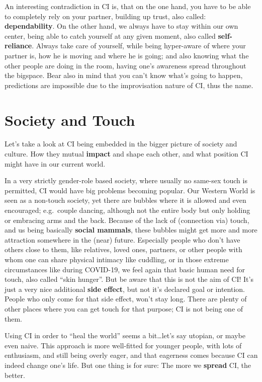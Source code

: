 An interesting contradiction in CI is, that on the one hand, you have to be able to completely rely on your partner, building up trust, also called: \textbf{dependability}.
On the other hand, we always have to stay within our own center, being able to catch yourself at any given moment, also called \textbf{self-reliance}.
Always take care of yourself, while being hyper-aware of where your partner is, how he is moving and where he is going;
and also knowing what the other people are doing in the room, having one's awareness spread throughout the \gls{bigspace}.
Bear also in mind that you can't know what's going to happen, predictions are impossible due to the improvisation nature of CI, thus the name.


\section{Society and Touch}\label{sec:society-and-touch}

Let's take a look at CI being embedded in the bigger picture of society and culture.
How they mutual \textbf{impact} and shape each other, and what position CI might have in our current world.

In a very strictly gender-role based society, where usually no same-sex touch is permitted, CI would have big problems becoming popular.
Our Western World is seen as a non-touch society, yet there are bubbles where it is allowed and even encouraged; e.g.\ couple dancing, although not the entire body but only holding or embracing arms and the back.
Because of the lack of (connection via) touch, and us being basically \textbf{social mammals}, these bubbles might get more and more attraction somewhere in the (near) future.
Especially people who don't have others close to them, like relatives, loved ones, partners, or other people with whom one can share physical intimacy like cuddling, or in those extreme circumstances like during COVID-19, we feel again that basic human need for touch, also called ``skin hunger''.
But be aware that this is not the aim of CI!
It's just a very nice additional \textbf{side effect}, but not it's declared goal or intention.
People who only come for that side effect, won't stay long.
There are plenty of other places where you can get touch for that purpose; CI is not being one of them.

Using CI in order to ``heal the world'' seems a bit\ldots let's say utopian, or maybe even naive.
This approach is more well-fitted for younger people, with lots of enthusiasm, and still being overly eager, and that eagerness comes because CI can indeed change one's life.
But one thing is for sure: The more we \textbf{spread} CI, the better.

